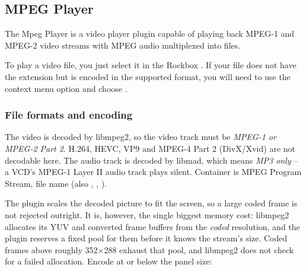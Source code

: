 \subsection{MPEG Player}
The Mpeg Player is a video player plugin capable of playing back MPEG-1 and 
MPEG-2 video streams with MPEG audio multiplexed into  files.

To play a video file, you just select it in the Rockbox .
If your file does not have the  extension but is encoded in the
supported format, you will need to use the  context menu
option and choose .


\subsubsection{File formats and encoding}
The video is decoded by libmpeg2, so the video track must be \emph{MPEG-1 or MPEG-2
Part 2}. H.264, HEVC, VP9 and MPEG-4 Part 2 (DivX/Xvid) are not decodable here. The
audio track is decoded by libmad, which means \emph{MP3 only} -- a VCD's MPEG-1 Layer II
audio track plays silent. Container is MPEG Program Stream, file name
 (also , , ).

The plugin scales the decoded picture to fit the screen, so a large coded frame is not
rejected outright. It is, however, the single biggest memory cost: libmpeg2 allocates its
YUV and converted frame buffers from the \emph{coded} resolution, and the plugin reserves
a fixed pool for them before it knows the stream's size. Coded frames above roughly
352$\times$288 exhaust that pool, and libmpeg2 does not check for a failed allocation.
Encode at or below the panel size:

